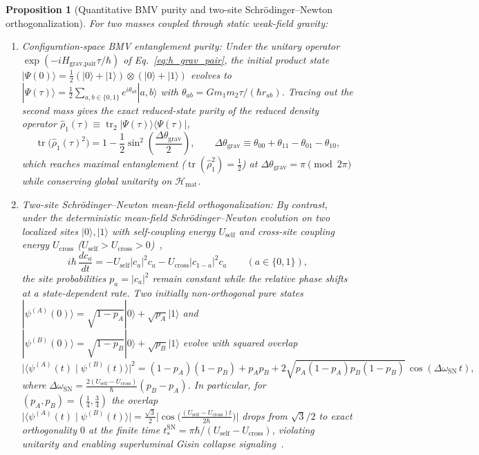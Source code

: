 \documentclass[aps,prd,onecolumn,tightenlines,nofootinbib,notitlepage,11pt,floatfix]{revtex4-2}
\theoremstyle{indentedtheorem}
\newtheorem{proposition}{Proposition}
\begin{document}
\begin{proposition}[Quantitative BMV purity and two-site Schr\"odinger--Newton orthogonalization]\label{prop:config_space_gravity}
For two masses coupled through static weak-field gravity:
\begin{enumerate}[label=(\roman*)]
\item \emph{Configuration-space BMV entanglement purity:} Under the unitary operator $\exp(-i H_\text{grav,pair}\tau/\hbar)$ of Eq.~\eqref{eq:h_grav_pair}, the initial product state $|\Psi(0)\rangle = \tfrac{1}{2}(|0\rangle+|1\rangle)\otimes(|0\rangle+|1\rangle)$ evolves to $|\Psi(\tau)\rangle = \tfrac{1}{2}\sum_{a,b\in\{0,1\}} e^{i\theta_{ab}}|a,b\rangle$ with $\theta_{ab} = G m_1 m_2 \tau / (\hbar r_{ab})$. Tracing out the second mass gives the exact reduced-state purity of the reduced density operator $\hat{\rho}_1(\tau)\equiv\operatorname{tr}_2|\Psi(\tau)\rangle\langle\Psi(\tau)|$,
\begin{equation}
    \operatorname{tr}\big(\hat{\rho}_1(\tau)^2\big) = 1 - \frac{1}{2}\sin^2\!\left(\frac{\Delta\theta_\text{grav}}{2}\right), \qquad \Delta\theta_\text{grav} \equiv \theta_{00}+\theta_{11}-\theta_{01}-\theta_{10} ,
    \label{eq:gie_phase}
\end{equation}
which reaches maximal entanglement ($\operatorname{tr}(\hat{\rho}_1^2)=\tfrac{1}{2}$) at $\Delta\theta_\text{grav}=\pi\pmod{2\pi}$ while conserving global unitarity on $\mathcal{H}_\text{mat}$.
\item \emph{Two-site Schr\"odinger--Newton mean-field orthogonalization:} By contrast, under the deterministic mean-field Schr\"odinger--Newton evolution on two localized sites $|0\rangle, |1\rangle$ with self-coupling energy $U_\text{self}$ and cross-site coupling energy $U_\text{cross}$ ($U_\text{self}>U_\text{cross}>0$)~\citep{Bahrami2014},
\begin{equation}
    i\hbar\,\frac{dc_a}{dt} = -U_\text{self} |c_a|^2 c_a - U_\text{cross} |c_{1-a}|^2 c_a \qquad (a\in\{0,1\}) ,
    \label{eq:sn_mean_field}
\end{equation}
the site probabilities $p_a=|c_a|^2$ remain constant while the relative phase shifts at a state-dependent rate. Two initially non-orthogonal pure states $|\psi^{(A)}(0)\rangle = \sqrt{1-p_A}|0\rangle + \sqrt{p_A}|1\rangle$ and $|\psi^{(B)}(0)\rangle = \sqrt{1-p_B}|0\rangle + \sqrt{p_B}|1\rangle$ evolve with squared overlap
\begin{equation}
    \big|\langle\psi^{(A)}(t)\mid\psi^{(B)}(t)\rangle\big|^2 = (1-p_A)(1-p_B) + p_A p_B + 2\sqrt{p_A(1-p_A)p_B(1-p_B)}\,\cos(\Delta\omega_\text{SN}\,t) ,
    \label{eq:sn_overlap_drift}
\end{equation}
where $\Delta\omega_\text{SN} = \frac{2(U_\text{self}-U_\text{cross})}{\hbar}(p_B-p_A)$. In particular, for $(p_A,p_B)=(\tfrac{1}{4},\tfrac{3}{4})$ the overlap $\big|\langle\psi^{(A)}(t)\mid\psi^{(B)}(t)\rangle\big| = \tfrac{\sqrt{3}}{2}\big|\cos\big(\frac{(U_\text{self}-U_\text{cross})t}{2\hbar}\big)\big|$ drops from $\sqrt{3}/2$ to exact orthogonality $0$ at the finite time $t_*^\text{SN} = \pi\hbar/(U_\text{self}-U_\text{cross})$, violating unitarity and enabling superluminal Gisin collapse signaling~\citep{Gisin1990,Bahrami2014}.
\end{enumerate}
\end{proposition}
\end{document}

